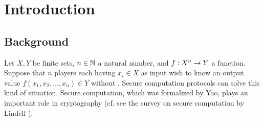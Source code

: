 \section{Introduction}

\subsection{Background}

Let $X, Y$ be finite sets, $n \in \mathbb{N}$ a natural number, and $f: X^n \rightarrow Y$ a function. 
Suppose that $n$ players each having $x_i \in X$ as input wish to know an output value $f(x_1, x_2, \ldots, x_n) \in Y$ without . 
Secure computation protocols can solve this kind of situation. 
Secure computation, which was formalized by Yao\cite{Yao82, Yao86}, plays an important role in cryptography (cf. see the survey on secure computation by Lindell \cite{Lindell20}). 

